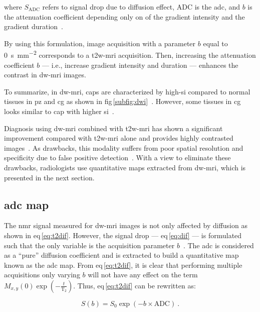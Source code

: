 \noindent where $S_{\text{ADC}}$ refers to signal drop due to diffusion effect,
$\text{ADC}$ is the \acl{adc}, and $b$ is the attenuation coefficient depending
only on of the gradient intensity and the gradient duration~\cite{LeBihan1986}.

By using this formulation, image acquisition with a parameter $b$ equal to
\SI{0}{\second\per\milli\metre\squared} corresponds to a \ac{t2w}-\ac{mri}
acquisition.
Then, increasing the attenuation coefficient $b$ --- i.e., increase gradient
intensity and duration --- enhances the contrast in \ac{dw}-\ac{mri} images.

To summarize, in \ac{dw}-\ac{mri}, \acp{cap} are characterized by
high-\ac{si} compared to normal tissues in \ac{pz} and \ac{cg} as shown in
\acs{fig}\,\ref{subfig:dwi}~\cite{Barentsz2012}.
However, some tissues in \ac{cg} looks similar to \ac{cap} with higher
\ac{si}~\cite{Barentsz2012}.

Diagnosis using \ac{dw}-\ac{mri} combined with \ac{t2w}-\ac{mri} has shown a
significant improvement compared with \ac{t2w}-\ac{mri} alone and provides
highly contrasted images~\cite{Shimofusa2005,Padhani2011,Choi2007}.
As drawbacks, this modality suffers from poor spatial resolution and
specificity due to false positive detection~\cite{Choi2007}.
With a view to eliminate these drawbacks, radiologists use quantitative maps
extracted from \ac{dw}-\ac{mri}, which is presented in the next section.

\subsection{\acs*{adc} map}\label{subsec:chp2:imaging:adc}
The \ac{nmr} signal measured for \ac{dw}-\ac{mri} images is not only affected
by diffusion as shown in \acs{eq}\,\eqref{eq:t2dif}.
However, the signal drop --- \acs{eq}\,\eqref{eq:dif} --- is formulated such
that the only variable is the acquisition parameter $b$~\cite{LeBihan1986}.
The \ac{adc} is considered as a ``pure'' diffusion coefficient and is extracted
to build a quantitative map known as the \acs{adc} map.
From \acs{eq}\,\eqref{eq:t2dif}, it is clear that performing multiple
acquisitions only varying $b$ will not have any effect on the term  $M_{x,y}(0)
\exp \left( - \frac{t}{\text{T}_2} \right)$.
Thus, \acs{eq}\,\eqref{eq:t2dif} can be rewritten as:

\begin{equation}
  S(b) = S_0 \exp \left( -b \times \text{ADC} \right) \ .
  \label{eq:t2adcrew}
\end{equation}

